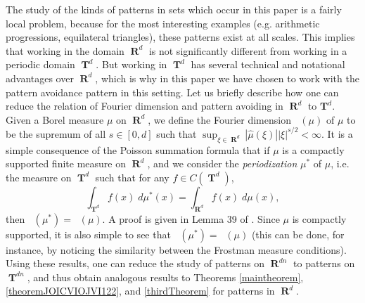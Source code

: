 \documentclass[dvipsnames,letterpaper,12pt]{article}
\numberwithin{equation}{section}
\DeclareMathOperator{\hausdim}{\dim_{\mathbf{H}}}
\DeclareMathOperator{\fordim}{\dim_{\mathbf{F}}}
\DeclareMathOperator{\RR}{\mathbf{R}}
\DeclareMathOperator{\TT}{\mathbf{T}}
\numberwithin{theorem}{section}
\begin{document}
The study of the kinds of patterns in sets which occur in this paper is a fairly local problem, because for the most interesting examples (e.g. arithmetic progressions, equilateral triangles), these patterns exist at all scales. This implies that working in the domain $\RR^d$ is not significantly different from working in a periodic domain $\TT^d$. But working in $\TT^d$ has several technical and notational advantages over $\RR^d$, which is why in this paper we have chosen to work with the pattern avoidance pattern in this setting. Let us briefly describe how one can reduce the relation of Fourier dimension and pattern avoiding in $\RR^d$ to $\mathbf{T}^d$. Given a Borel measure $\mu$ on $\RR^d$, we define the Fourier dimension $\fordim(\mu)$ of $\mu$ to be the supremum of all $s \in [0,d]$ such that $\sup_{\xi \in \RR^d} |\widehat{\mu}(\xi)| |\xi|^{s/2} < \infty$. It is a simple consequence of the Poisson summation formula that if $\mu$ is a compactly supported finite measure on $\RR^d$, and we consider the  \emph{periodization} $\mu^*$ of $\mu$, i.e. the measure on $\TT^d$ such that for any $f \in C(\TT^d)$,
%
\begin{equation}
    \int_{\TT^d} f(x)\; d\mu^*(x) = \int_{\RR^d} f(x)\; d\mu(x),
\end{equation}
%
then $\fordim(\mu^*) = \fordim(\mu)$. A proof is given in Lemma 39 of \cite{MyThesis}. Since $\mu$ is compactly supported, it is also simple to see that $\hausdim(\mu^*) = \hausdim(\mu)$ (this can be done, for instance, by noticing the similarity between the Frostman measure conditions). Using these results, one can reduce the study of patterns on $\RR^{dn}$ to patterns on $\TT^{dn}$, and thus obtain analogous results to Theorems \ref{maintheorem}, \ref{theoremJOICVIOJVI122}, and \ref{thirdTheorem} for patterns in $\RR^d$.

\begin{comment}
It is expected that Theorem \ref{theoremJOICVIOJVI122} is tight for general patterns $Z$. If $E$ is Salem and has dimension $d/(n-1)$, then $f(E^n)$ is a subset of $\TT^{d(n-1)}$ with nonempty interior, because
%
\begin{align*}
    \int e^{-2 \pi i \xi \cdot y} df_*(\mu^{\otimes})(y) &= \int e^{-2 \pi i \xi \cdot f(x)} d\mu(x_1) \dots d\mu(x_n)\\
    &= \lim_{k \to \infty} \int e^{-2 \pi i \xi \cdot f(x)} \phi^{\otimes}_k(x) dx\\
    &= \lim_{k \to \infty} \int e^{-2 \pi i \xi \cdot (x_1 + \dots + x_n)} \det(D_{x_1} f) \phi_k(g(z,x_2,\dots,x_n)) \phi_k^{\otimes}(x)\; dx
\end{align*}
%
where $f(g(z,x_2,\dots,x_n),x_2,\dots,x_n) = z$.
On the other hand, for patterns with richer structure this result is certainly non-optimal. For instance, in BLAH a Salem set in $\RR$ of dimension one is constructed avoiding solutions to the equation $x_3 = 2x_2 - x_1$; our techniques only guarantee the existence of a Salem set of dimension $1/2$.
\end{comment}
\end{document}
